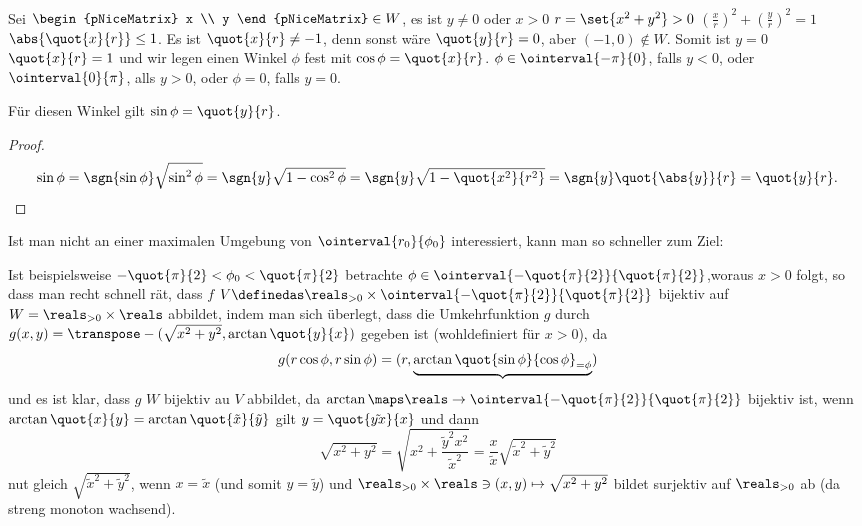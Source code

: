 \begin{beispiele}
\begin{enumerate}
\begin{beachte*}
       Sei \( \begin{pNiceMatrix} x \\ y \end{pNiceMatrix} \in W \), \dh es ist \( y\neq 0 \) oder \( x>0 \) \timplies \( r=\set{x^2+y^2}>0 \) \timplies \( \left( \frac{x}{r} \right)^2+\left( \frac{y}{r} \right)^2=1 \) \timplies \( \abs{\quot{x}{r}}\leq 1 \). Es ist \( \quot{x}{r}\neq -1 \), denn sonst wäre \( \quot{y}{r}=0 \), aber \( (-1,0)\notin W \). Somit ist \( y=0 \) \tiff \( \quot{x}{r}=1 \) und wir legen einen Winkel \( \phi \) fest mit \( \cos \phi=\quot{x}{r} \). \( \phi\in \ointerval{-\pi
        }{0} \), falls \( y<0 \), oder \( \ointerval{0}{\pi} \), alls \( y>0 \), oder \( \phi=0 \), falls \( y=0. \)

      \begin{behauptung*}
        Für diesen Winkel gilt \( \sin \phi=\quot{y}{r} \).
      \end{behauptung*}
      \begin{proof}
        \begin{equation*}
          \sin \phi=\sgn{\sin \phi}\sqrt{\sin^2 \phi}=\sgn{y}\sqrt{1-\cos^2 \phi}=\sgn{y}\sqrt{1-\quot{x^2}{r^2}}=\sgn{y}\quot{\abs{y}}{r}=\quot{y}{r}.
        \end{equation*}
      \end{proof}
      Ist man nicht an einer maximalen Umgebung von \( \ointerval{r_0}{\phi_0}  \) interessiert, kann man so schneller zum Ziel:

      Ist beispielsweise \( -\quot{\pi}{2}<\phi_0<\quot{\pi}{2} \) betrachte \( \phi\in \ointerval{-\quot{\pi}{2}}{\quot{\pi}{2}} \),woraus \( x>0 \) folgt, so dass man recht schnell rät, dass \( f \) \( V\definedas \reals_{>0}\times  \ointerval{-\quot{\pi}{2}}{\quot{\pi}{2}} \) bijektiv auf \( W=\reals_{>0}\times \reals \) abbildet, indem man sich überlegt, dass die Umkehrfunktion \( g \) durch \( g(x,y)=\transpose-{(\sqrt{x^2+y^2}, \arctan \quot{y}{x})} \) gegeben ist (wohldefiniert für \( x>0 \)), da 
      \begin{equation*}
        g(r \cos \phi, r\sin \phi)=(r,\underbrace{\arctan \quot{\sin \phi}{\cos \phi}_{=\phi}})
      \end{equation*}
      und es ist klar, dass \( g \) \( W \) bijektiv au \( V \) abbildet, da \( \arctan\maps \reals\to \ointerval{-\quot{\pi}{2}}{\quot{\pi}{2}} \) bijektiv ist, \sd  wenn \( \arctan \quot{x}{y}=\arctan \quot{\tilde{x}}{\tilde{y}} \) gilt \( y=\quot{\tilde{yx}}{x} \) und dann
      \begin{equation*}
        \sqrt{x^2+y^2}=\sqrt{x^2+\frac{\tilde{y}^2 x^2}{\tilde{x}^2}}=\frac{x}{\tilde{x}}\sqrt{\tilde{x}^2+\tilde{y}^2}
      \end{equation*}
      nut gleich \( \sqrt{\tilde{x}^2+\tilde{y}^2} \), wenn \( x=\tilde{x} \) (und somit \( y= \tilde{y}\)) und \( \reals_{>0}\times\reals\ni (x,y)\mapsto \sqrt{x^2+y^2} \) bildet surjektiv auf \( \reals_{>0} \) ab (da streng monoton wachsend).
    \end{beachte*}
  \end{enumerate}
\end{beispiele}
